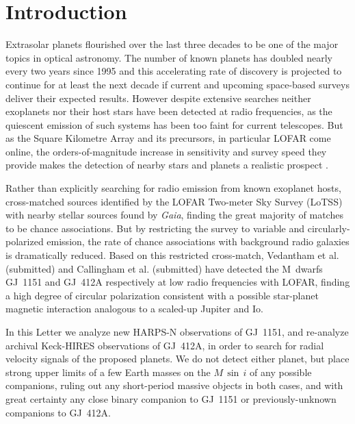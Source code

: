 \documentclass[modern]{aastex62}
\newcommand{\gaia}{\textit{Gaia}\xspace}
\begin{document}
\section{Introduction} 
\label{sec:intro}

Extrasolar planets flourished over the last three decades to be one of the major topics in optical astronomy. The number of known planets has doubled nearly every two years since 1995 \citep{Mamajek2016} and this accelerating rate of discovery is projected to continue for at least the next decade if current and upcoming space-based surveys deliver their expected results. However despite extensive searches \citep{2000ApJ...545.1058B,2013A&A...552A..65L,2018MNRAS.tmp.1077L} neither exoplanets nor their host stars have been detected at radio frequencies, as the quiescent emission of such systems has been too faint for current telescopes. But as the Square Kilometre Array \citep[SKA;][]{2009IEEEP..97.1482D} and its precursors, in particular LOFAR \citep[the LOw-Frequency ARray:][]{lofar} come online, the orders-of-magnitude increase in sensitivity and survey speed they provide makes the detection of nearby stars and planets a realistic prospect \citep{pope19}. 

Rather than explicitly searching for radio emission from known exoplanet hosts, \citet{Callingham_2019} cross-matched sources identified by the LOFAR Two-meter Sky Survey (LoTSS) with nearby stellar sources found by \gaia, finding the great majority of matches to be chance associations. But by restricting the survey to variable and circularly-polarized emission, the rate of chance associations with background radio galaxies is dramatically reduced. Based on this restricted cross-match, Vedantham et al. (submitted) and Callingham et al. (submitted) have detected the M~dwarfs GJ~1151 and GJ~412A respectively at low radio frequencies with LOFAR, finding a high degree of circular polarization consistent with a possible star-planet magnetic interaction analogous to a scaled-up Jupiter and Io. 

In this Letter we analyze new HARPS-N \citep[High Accuracy Radial velocity Planet Searcher:][]{harpsn} observations of GJ~1151, and re-analyze archival Keck-HIRES \citep{hires} observations of GJ~412A, in order to search for radial velocity signals of the proposed planets. We do not detect either planet, but place strong upper limits of a few Earth masses on the $M\,\sin\,{i}$ of any possible companions, ruling out any short-period massive objects in both cases, and with great certainty any close binary companion to GJ~1151 or previously-unknown companions to GJ~412A.  
\end{document}
